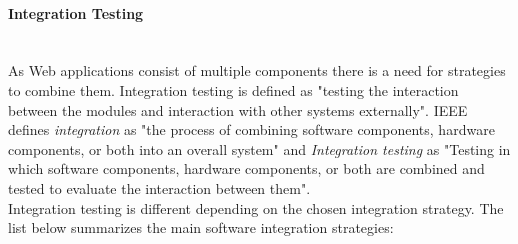 \documentclass[12pt, notitlepage]{article}
\begin{document}
\paragraph{Integration Testing} ~\\
As Web applications consist of multiple components there is a need for strategies to combine them. Integration testing\cite{sw-testing-quality-assurance} is defined as "testing the interaction between the modules and interaction with other systems externally". IEEE defines
\textit{integration}\cite{ieee-definition} as "the process of combining software components, hardware components, or both into an overall system" and \textit{Integration testing}\cite{ieee-definition} as 
"Testing in which software components, hardware components, or both are combined and tested to evaluate the interaction between them".\\
Integration testing is different depending on the chosen integration strategy. The list below summarizes the main software integration strategies\cite{schattenbest}:\\
\end{document}
